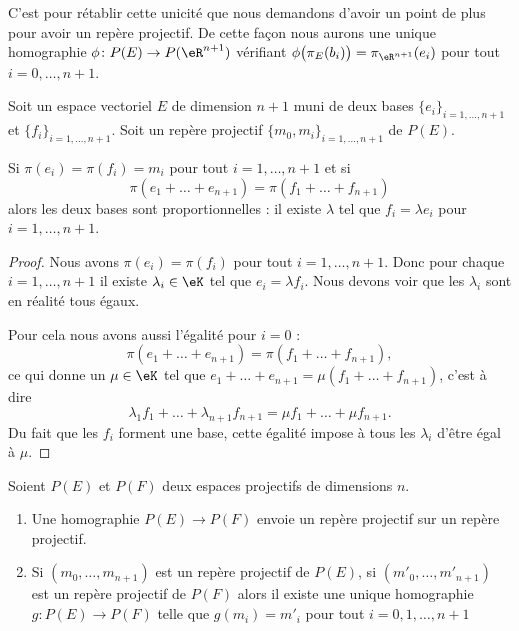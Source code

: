 C'est pour rétablir cette unicité que nous demandons d'avoir un point de plus pour avoir un repère projectif. De cette façon nous aurons une unique homographie \( \phi\colon P(E)\to P(\eR^{n+1})\) vérifiant \( \phi\big( \pi_E(b_i) \big)=\pi_{\eR^{n+1}}(e_i)\) pour tout \( i=0,\ldots, n+1\).

\begin{lemma}
    Soit un espace vectoriel \( E\) de dimension \( n+1\) muni de deux bases \( \{ e_i \}_{i=1,\ldots, n+1}\) et \( \{ f_i \}_{i=1,\ldots, n+1}\). Soit un repère projectif \( \{ m_0,m_i \}_{i=1,\ldots, n+1}  \) de \( P(E)\).

    Si \( \pi(e_i)=\pi(f_i)=m_i\) pour tout \( i=1,\ldots, n+1\) et si 
    \begin{equation}
        \pi(e_1+\ldots +e_{n+1})=\pi(f_1+\ldots +f_{n+1})
    \end{equation}
    alors les deux bases sont proportionnelles : il existe \( \lambda\) tel que \( f_i=\lambda e_i\) pour \( i=1,\ldots, n+1\).
\end{lemma}

\begin{proof}
    Nous avons \( \pi(e_i)=\pi(f_i)\) pour tout \( i=1,\ldots, n+1\). Donc pour chaque $i=1,\ldots, n+1$ il existe \( \lambda_i\in \eK\) tel que \( e_i=\lambda f_i\). Nous devons voir que les \( \lambda_i\) sont en réalité tous égaux.

    Pour cela nous avons aussi l'égalité pour \( i=0\) :
    \begin{equation}
        \pi(e_1+\ldots +e_{n+1})=\pi(f_1+\ldots +f_{n+1}),
    \end{equation}
    ce qui donne un \( \mu\in \eK\) tel que $e_1+\ldots +e_{n+1}=\mu(f_1+\ldots +f_{n+1})$, c'est à dire
    \begin{equation}
        \lambda_1 f_1+\ldots +\lambda_{n+1}f_{n+1}=\mu f_1+\ldots +\mu f_{n+1}.
    \end{equation}
    Du fait que les \( f_i\) forment une base, cette égalité impose à tous les \( \lambda_i\) d'être égal à \( \mu\).
\end{proof}

\begin{theorem}     \label{THOooTXPVooJGigne}
    Soient \( P(E)\) et \( P(F)\) deux espaces projectifs de dimensions \( n\).
    \begin{enumerate}
        \item       \label{ITEMooRSIWooXbEnlT}
            Une homographie \( P(E)\to P(F)\) envoie un repère projectif sur un repère projectif.
        \item       \label{ITEMooQXQXooDyIsxsh}
            Si \( (m_0,\ldots, m_{n+1})\) est un repère projectif de \( P(E)\), si \( (m'_0,\ldots, m'_{n+1})\) est un repère projectif de \( P(F)\) alors il existe une unique homographie \( g\colon P(E)\to P(F)\) telle que \( g(m_i)=m'_i\) pour tout \( i=0,1,\ldots, n+1\)
    \end{enumerate}
\end{theorem}

